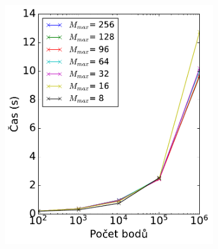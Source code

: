 \begin{figure}
 
\begin{subfigure}[t]{0.29\columnwidth}
    \centering  
    \includegraphics[scale=0.4]{obrazky-figures/benchmark/benchmark_builtime_points_Mmax.pdf}


\end{subfigure}
\end{figure}
